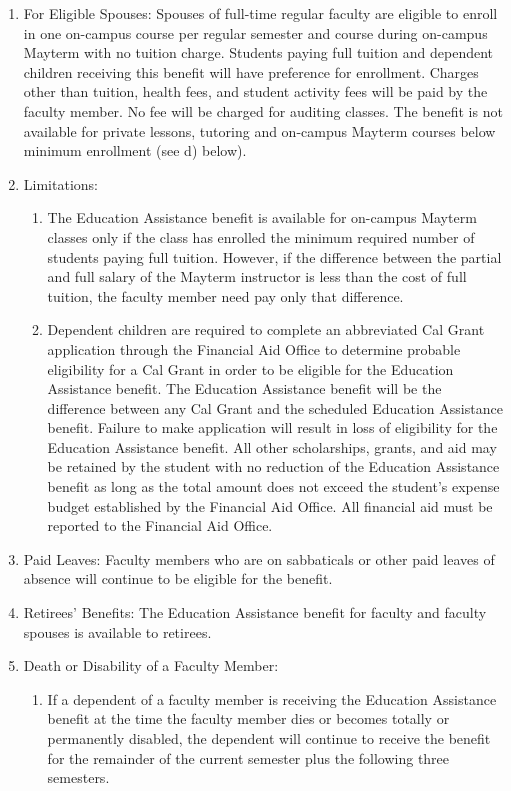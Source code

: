 \documentclass[letterpaper, 11pt]{article}
\begin{document}
\begin{enumerate}[label=\alph*)]
					\item{For Eligible Spouses:}
					Spouses of full-time regular faculty are eligible to enroll in one on-campus course per regular semester and course during on-campus Mayterm with no tuition charge.  Students paying full tuition and dependent children receiving this benefit will have preference for enrollment.  Charges other than tuition, health fees, and student activity fees will be paid by the faculty member.  No fee will be charged for auditing classes.  The benefit is not available for private lessons, tutoring and on-campus Mayterm courses below minimum enrollment (see d) below).
					\item{Limitations:
						\begin{enumerate}[label=\arabic*)]
							\item{The Education Assistance benefit is available for on-campus Mayterm classes only if the class has enrolled the minimum required number of students paying full tuition.  However, if the difference between the partial and full salary of the Mayterm instructor is less than the cost of full tuition, the faculty member need pay only that difference.}
							\item{Dependent children are required to complete an abbreviated Cal Grant application through the Financial Aid Office to determine probable eligibility for a Cal Grant in order to be eligible for the Education Assistance benefit.  The Education Assistance benefit will be the difference between any Cal Grant and the scheduled Education Assistance benefit.  Failure to make application will result in loss of eligibility for the Education Assistance benefit.  All other scholarships, grants, and aid may be retained by the student with no reduction of the Education Assistance benefit as long as the total amount does not exceed the student's expense budget established by the Financial Aid Office.  All financial aid must be reported to the Financial Aid Office.}
						\end{enumerate}
					}
					\item{Paid Leaves:}
					Faculty members who are on sabbaticals or other paid leaves of absence will continue to be eligible for the benefit.
					\item{Retirees' Benefits:}
					The Education Assistance benefit for faculty and faculty spouses is available to retirees.
					\item{Death or Disability of a Faculty Member:
						\begin{enumerate}[label=\arabic*)]
							\item{If a dependent of a faculty member is receiving the Education Assistance benefit at the time the faculty member dies or becomes totally or permanently disabled, the dependent will continue to receive the benefit for the remainder of the current semester plus the following three semesters.}

\end{enumerate}}
\end{enumerate}
\end{document}
